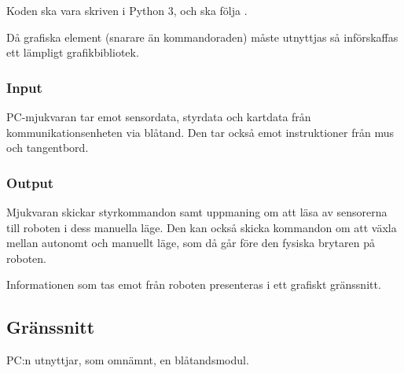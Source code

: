 \documentclass[a4paper,11pt]{article}
\begin{document}
Koden ska vara skriven i Python 3, och ska följa \cite{pep8}.

Då grafiska element (snarare än kommandoraden) måste utnyttjas så införskaffas ett lämpligt grafikbibliotek.

\subsubsection{Input}
PC-mjukvaran tar emot sensordata, styrdata och kartdata från kommunikationsenheten via blåtand. Den tar också emot instruktioner från mus och tangentbord. 

\subsubsection{Output}
Mjukvaran skickar styrkommandon samt uppmaning om att läsa av sensorerna till roboten i dess manuella läge. Den kan också skicka kommandon om att växla mellan autonomt och manuellt läge, som då går före den fysiska brytaren på roboten.

Informationen som tas emot från roboten presenteras i ett grafiskt gränssnitt.

\subsection{Gränssnitt} \label{ssec:PCInterface}

PC:n utnyttjar, som omnämnt, en blåtandsmodul.
\end{document}
